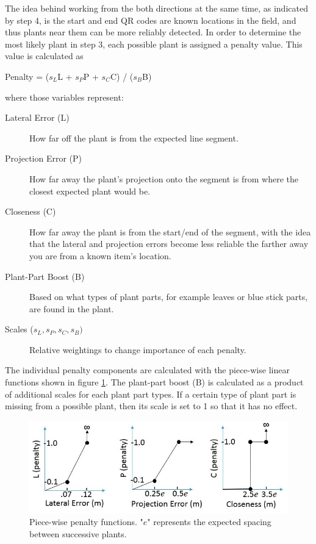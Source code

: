 The idea behind working from the both directions at the same time, as indicated by step 4, is the start and end QR codes are known locations in the field, and thus plants near them can be more reliably detected.  In order to determine the most likely plant in step 3, each possible plant is assigned a penalty value.  This value is calculated as

\begin{center}
Penalty = ($s_L$L + $s_P$P + $s_C$C) / ($s_B$B)
\end{center}
where those variables represent:

\begin{description}
\item[Lateral Error (L)] How far off the plant is from the expected line segment.
\item[Projection Error (P)] How far away the plant's projection onto the segment is from where the closest expected plant would be.
\item[Closeness (C)] How far away the plant is from the start/end of the segment, with the idea that the lateral and projection errors become less reliable the farther away you are from a known item's location.
\item[Plant-Part Boost (B)] Based on what types of plant parts, for example leaves or blue stick parts, are found in the plant.
\item[Scales ($s_L,s_P,s_C,s_B)$] Relative weightings to change importance of each penalty.
\end{description}

The individual penalty components are calculated with the piece-wise linear functions shown in figure \ref{figure:piecewise_penalties}.  The plant-part boost (B) is calculated as a product of additional scales for each plant part types.  If a certain type of plant part is missing from a possible plant, then its scale is set to 1 so that it has no effect.  

\begin{figure}
	\centering
    \includegraphics[width=5.5in]{figures/piece_wise.jpg}
    \caption[Group segments]{Piece-wise penalty functions. "$e$" represents the expected spacing between successive plants.}
    \label{figure:piecewise_penalties}
\end{figure}

